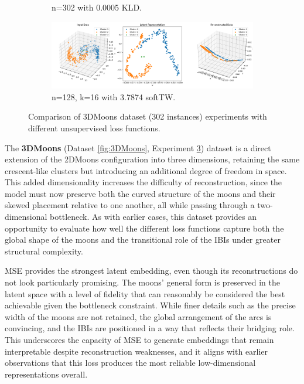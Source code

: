 \begin{figure}[htbp]
\begin{subfigure}[b]{1.0\textwidth}
    \caption{n=302 with 0.0005 KLD.}
    \label{fig:RQ2/kld/3DMoons}
  \end{subfigure}
  \hfill
  \begin{subfigure}[b]{1.0\textwidth}
    \centering
    \includegraphics[width=\linewidth]{images/RQ2/tru/3DMoons_128n_16k_3.7874.png}
    \caption{n=128, k=16 with 3.7874 softTW.}
    \label{fig:RQ2/tru/3DMoons}
  \end{subfigure}

  \caption{Comparison of 3DMoons dataset (302 instances) experiments with different unsupervised loss functions.}
  \label{fig:RQ2/3DMoons}
\end{figure}

The \textbf{3DMoons} (Dataset \ref{fig:3DMoons}, Experiment \ref{fig:RQ2/3DMoons}) dataset is a direct extension of the 2DMoons configuration into three dimensions, retaining the same crescent-like clusters but introducing an additional degree of freedom in space. This added dimensionality increases the difficulty of reconstruction, since the model must now preserve both the curved structure of the moons and their skewed placement relative to one another, all while passing through a two-dimensional bottleneck. As with earlier cases, this dataset provides an opportunity to evaluate how well the different loss functions capture both the global shape of the moons and the transitional role of the IBIs under greater structural complexity.

MSE provides the strongest latent embedding, even though its reconstructions do not look particularly promising. The moons’ general form is preserved in the latent space with a level of fidelity that can reasonably be considered the best achievable given the bottleneck constraint. While finer details such as the precise width of the moons are not retained, the global arrangement of the arcs is convincing, and the IBIs are positioned in a way that reflects their bridging role. This underscores the capacity of MSE to generate embeddings that remain interpretable despite reconstruction weaknesses, and it aligns with earlier observations that this loss produces the most reliable low-dimensional representations overall.

